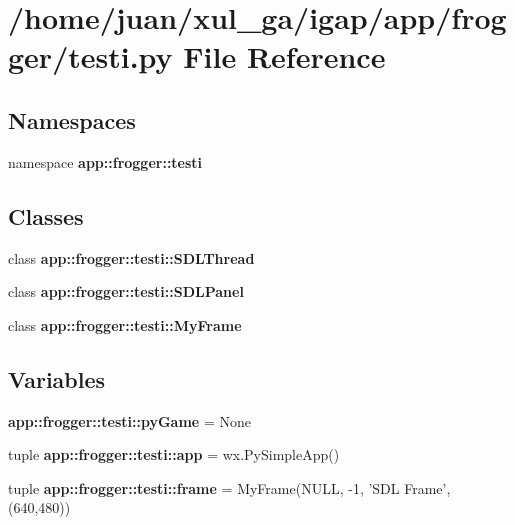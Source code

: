 \section{/home/juan/xul\_\-ga/igap/app/frogger/testi.py File Reference}
\label{app_2frogger_2testi_8py}
\subsection*{Namespaces}
\begin{CompactItemize}
\item 
namespace {\bf app::frogger::testi}
\end{CompactItemize}
\subsection*{Classes}
\begin{CompactItemize}
\item 
class {\bf app::frogger::testi::SDLThread}
\item 
class {\bf app::frogger::testi::SDLPanel}
\item 
class {\bf app::frogger::testi::MyFrame}
\end{CompactItemize}
\subsection*{Variables}
\begin{CompactItemize}
\item 
{\bf app::frogger::testi::pyGame} = None
\item 
tuple {\bf app::frogger::testi::app} = wx.PySimpleApp()
\item 
tuple {\bf app::frogger::testi::frame} = MyFrame(NULL, -1, 'SDL Frame',(640,480))
\end{CompactItemize}
